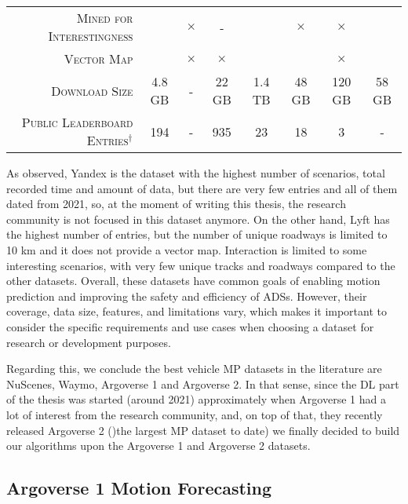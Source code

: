 \begin{table}[!tpbh]
\begin{adjustbox}{max width=\columnwidth}
\begin{tabular}{rccccccc}
			\textsc{Mined for Interestingness} & \checkmark & $\times$ & - & \checkmark & $\times$ & $\times$ & \checkmark \\
			\textsc{Vector Map} & \checkmark & $\times$ & $\times$ & \checkmark & \checkmark & $\times$ &\checkmark \\
			\textsc{Download Size} & 4.8 GB  & -  & 22 GB  & 1.4 TB  & 48 GB & 120 GB & 58 GB \\
			\textsc{Public Leaderboard Entries}$^\dagger$ & 194  & -  & 935  & 23 & 18 & 3 & - \\
			\bottomrule
		\end{tabular}
		\endgroup
	\end{adjustbox}
\end{table}

As observed, Yandex is the dataset with the highest number of scenarios, total recorded time and amount of data, but there are very few entries and all of them dated from 2021, so, at the moment of writing this thesis, the research community is not focused in this dataset anymore. On the other hand, Lyft has the highest number of entries, but the number of unique roadways is limited to 10 km and it does not provide a vector map. Interaction is limited to some interesting scenarios, with very few unique tracks and roadways compared to the other datasets. Overall, these datasets have common goals of enabling motion prediction and improving the safety and efficiency of \acp{ADS}. However, their coverage, data size, features, and limitations vary, which makes it important to consider the specific requirements and use cases when choosing a dataset for research or development purposes. 

Regarding this, we conclude the best vehicle \ac{MP} datasets in the literature are NuScenes, Waymo, Argoverse 1 and Argoverse 2. In that sense, since the \ac{DL} part of the thesis was started (around 2021) approximately when Argoverse 1 had a lot of interest from the research community, and, on top of that, they recently released Argoverse 2 ()the largest \ac{MP} dataset to date) we finally decided to build our algorithms upon the Argoverse 1 and Argoverse 2 datasets.

\subsection{Argoverse 1 Motion Forecasting}
\label{subsec:2_argoverse_1}


